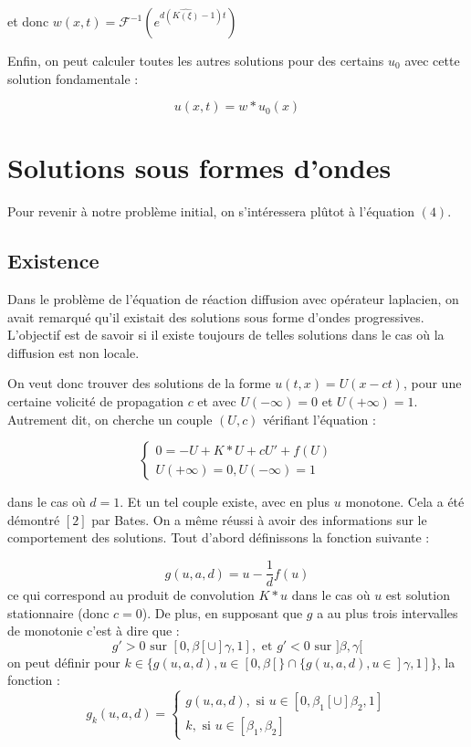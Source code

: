 \documentclass{article}
\begin{document}
et donc $w(x,t) = \mathcal{F}^{-1} (e^{d(\widehat{K(\xi)} -1)t})$\newline 

Enfin, on peut calculer toutes les autres solutions pour des certains $u_0$ avec cette solution fondamentale :

\begin{equation}
u(x,t) = w*u_0(x)
\end{equation}



\section{Solutions sous formes d'ondes}
Pour revenir à notre problème initial, on s'intéressera plûtot à l'équation $(4)$.

\subsection{Existence}
Dans le problème de l'équation de réaction diffusion avec opérateur laplacien, on avait remarqué qu'il existait des solutions sous forme d'ondes progressives. L'objectif est de savoir si il existe toujours de telles solutions dans le cas où la diffusion est non locale.

On veut donc trouver des solutions de la forme $u(t,x) = U(x-ct) $, pour une certaine volicité de propagation $c$ et avec $U(-\infty) = 0$ et $U(+\infty) = 1$. Autrement dit, on cherche un couple $(U,c)$ vérifiant l'équation :

\begin{equation}
\left\{
\begin{array}{cc}
0 = -U + K*U + cU' + f(U) \\
U(+\infty) = 0 , U(-\infty) = 1
\end{array}
\right.
\end{equation}

\noindent dans le cas où $d=1$.
Et un tel couple existe, avec en plus $u$ monotone. Cela a été démontré $[2]$ par Bates. On a même réussi à avoir des informations sur le comportement des solutions. Tout d'abord définissons la fonction suivante : 

\begin{equation}
	g(u,a,d) = u - \frac{1}{d} f(u)
\end{equation}
ce qui correspond au produit de convolution $K*u$ dans le cas où $u$ est solution stationnaire (donc $c=0$). De plus, en supposant que $g$ a au plus trois intervalles de monotonie c'est à dire que :
\begin{equation*}
g'>0 \text{ sur } [0,\beta[\cup]\gamma,1], \text{ et } g'<0 \text{ sur } ]\beta,\gamma[
\end{equation*}
on peut définir pour $k \in \{ g(u,a,d), u \in [0,\beta[\} \cap \{ g(u,a,d), u \in ]\gamma, 1]\}$, la fonction : 
\begin{equation*}
	g_k(u,a,d) = \left \{ \begin{array}{cc} g(u,a,d), \text{ si } u \in  [0,\beta_1[\cup]\beta_2,1] \\ k , \text{ si } u \in [\beta_1,\beta_2] \end{array} \right.
\end{equation*}
\end{document}
